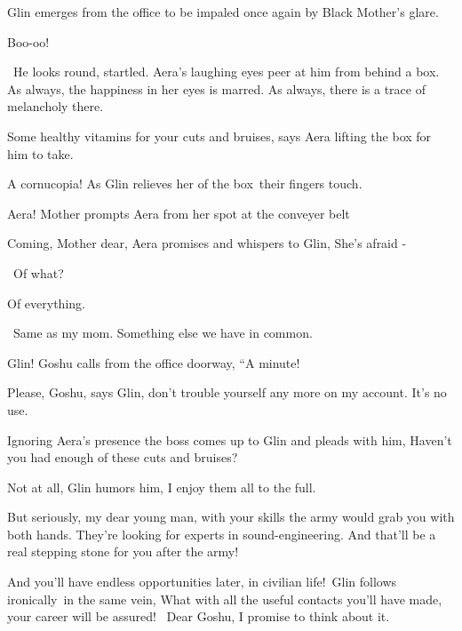 \documentclass[letterpaper]{article}
\begin{document}
Glin emerges from the office to be impaled once again by Black Mother's glare. 

{\textquotedbl}Boo-oo!{\textquotedbl}

~He looks round, startled. Aera's laughing eyes peer at him from behind a box. As always, the happiness in her eyes is
marred. As always, there is a trace of melancholy there.

{\textquotedbl}Some healthy vitamins for your cuts and bruises,{\textquotedbl} says Aera lifting the box for him to
take. 

{\textquotedbl}A cornucopia!{\textquotedbl} As Glin relieves her of the box~their fingers touch.

{\textquotedbl}Aera!{\textquotedbl} Mother prompts Aera from her spot at the conveyer belt 

{\textquotedbl}Coming, Mother dear,{\textquotedbl} Aera promises and whispers to Glin, {\textquotedbl}She's afraid
-{\textquotedbl}\ 

~{\textquotedbl}Of what?{\textquotedbl} 

{\textquotedbl}Of everything.{\textquotedbl} 

~{\textquotedbl}Same as my mom. Something else we have in common.{\textquotedbl}

{\textquotedbl}Glin!{\textquotedbl} Goshu calls from the office doorway, ``A minute!{\textquotedbl} 

{\textquotedbl}Please, Goshu,{\textquotedbl} says Glin, {\textquotedbl}don't trouble yourself any more on my account.
It's no use.{\textquotedbl}

Ignoring Aera's presence the boss comes up to Glin and pleads with him, {\textquotedbl}Haven't you had enough of these
cuts and bruises?{\textquotedbl}

{\textquotedbl}Not at all,{\textquotedbl} Glin humors him, {\textquotedbl}I enjoy them all to the full.{\textquotedbl}

{\textquotedbl}But seriously, my dear young man, with your skills the army would grab you with both hands. They're
looking for experts in sound-engineering. And that'll be a real stepping stone for you after the army!{\textquotedbl} 

{\textquotedbl}And you'll have endless opportunities later, in civilian life!{\textquotedbl}\  Glin follows
ironically\textcolor{red}{\ }in the same vein, {\textquotedbl}What with all the useful contacts you'll have made, your
career will be assured! ~Dear Goshu, I promise to think about it.{\textquotedbl} 
\end{document}

